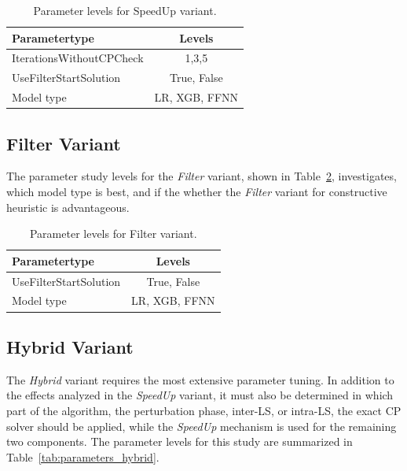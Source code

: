 \begin{table}[ht]
    \centering
    \def\arraystretch{1.2}
    \begin{tabular}{l c }
        \toprule
        Parametertype            & Levels                          \\
        \midrule
        IterationsWithoutCPCheck & 1,3,5                           \\
        UseFilterStartSolution   & True, False                     \\
        Model type               & \gls{LR}, \gls{XGB}, \gls{FFNN} \\
        \bottomrule
    \end{tabular}
    \caption{Parameter levels for SpeedUp variant.}
    \label{tab:parameters_speedup}
\end{table}

\subsection{Filter Variant}
\label{subsec_parameterStuy_filter}

The parameter study levels for the \textit{Filter} variant, shown in Table~\ref{tab:parameters_filter}, investigates, which model
type is best, and if the whether the \textit{Filter} variant for constructive heuristic is advantageous.
\begin{table}[ht]
    \centering
    \def\arraystretch{1.2}
    \begin{tabular}{l c }
        \toprule
        Parametertype          & Levels                          \\
        \midrule
        UseFilterStartSolution & True, False                     \\
        Model type             & \gls{LR}, \gls{XGB}, \gls{FFNN} \\
        \bottomrule
    \end{tabular}
    \caption{Parameter levels for Filter variant.}
    \label{tab:parameters_filter}
\end{table}


\subsection{Hybrid Variant}
\label{subsec_parameterStuy_hybrid}
The \textit{Hybrid} variant requires the most extensive parameter tuning. In addition to the effects analyzed in the
\textit{SpeedUp} variant, it must also be determined in which part of the algorithm, the perturbation phase, inter-LS, or intra-LS,
the exact \gls{CP} solver should be applied, while the \textit{SpeedUp} mechanism is used for the remaining two components.
The parameter levels for this study are summarized in Table~\ref{tab:parameters_hybrid}.

